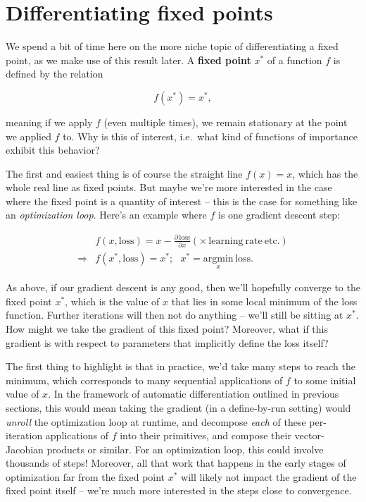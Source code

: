 \documentclass[
  11pt,
  numbers=noendperiod]{book}
\begin{document}
\hypertarget{sec-fixed-points}{%
\section{Differentiating fixed points}\label{sec-fixed-points}}

We spend a bit of time here on the more niche topic of differentiating a
fixed point, as we make use of this result later. A \textbf{fixed point}
\(x^*\) of a function \(f\) is defined by the relation

\[
f(x^*) = x^*,
\]

meaning if we apply \(f\) (even multiple times), we remain stationary at
the point we applied \(f\) to. Why is this of interest, i.e.~what kind
of functions of importance exhibit this behavior?

The first and easiest thing is of course the straight line \(f(x) = x\),
which has the whole real line as fixed points. But maybe we're more
interested in the case where the fixed point is a quantity of interest
-- this is the case for something like an \emph{optimization loop}.
Here's an example where \(f\) is one gradient descent step:

\begin{align}
&f(x, \mathrm{loss}) = x - \frac{\partial\, \mathrm{loss}}{\partial x}\left( \times \, \mathrm{learning~rate~etc.}\right)
\\ \Rightarrow &f(x^*, \mathrm{loss} ) = x^*;~~~x^* = \underset{x}{\mathrm{argmin}}\, \mathrm{loss}.
\end{align}

As above, if our gradient descent is any good, then we'll hopefully
converge to the fixed point \(x^*\), which is the value of \(x\) that
lies in some local minimum of the loss function. Further iterations will
then not do anything -- we'll still be sitting at \(x^*\). How might we
take the gradient of this fixed point? Moreover, what if this gradient
is with respect to parameters that implicitly define the loss itself?

The first thing to highlight is that in practice, we'd take many steps
to reach the minimum, which corresponds to many sequential applications
of \(f\) to some initial value of \(x\). In the framework of automatic
differentiation outlined in previous sections, this would mean taking
the gradient (in a define-by-run setting) would \emph{unroll} the
optimization loop at runtime, and decompose \emph{each} of these
per-iteration applications of \(f\) into their primitives, and compose
their vector-Jacobian products or similar. For an optimization loop,
this could involve thousands of steps! Moreover, all that work that
happens in the early stages of optimization far from the fixed point
\(x^*\) will likely not impact the gradient of the fixed point itself --
we're much more interested in the steps close to convergence.
\end{document}
